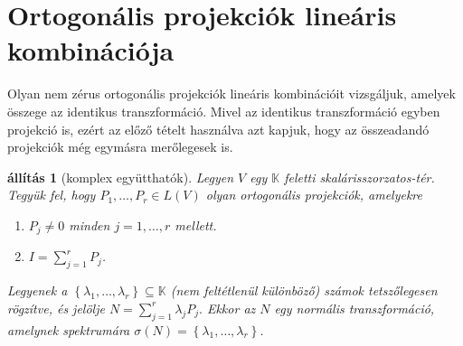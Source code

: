 \documentclass[a4paper, showtrims]{memoir}
\theoremstyle{plain}
\newtheorem{proposition}{állítás}[chapter]
\theoremstyle{remark}
\theoremstyle{definition}
\begin{document}
\section{Ortogonális projekciók lineáris kombinációja}
Olyan nem zérus ortogonális projekciók lineáris kombinációit vizsgáljuk,
amelyek összege az identikus transzformáció.
Mivel az identikus transzformáció egyben projekció is,
ezért az előző tételt használva azt kapjuk, hogy az összeadandó projekciók még egymásra merőlegesek is.
\begin{proposition}[komplex együtthatók]\label{pr:normlinkombkomplex}
	Legyen $V$ egy $\mathbb{K}$ feletti skalárisszorzatos-tér.
	Tegyük fel, hogy $P_1,\ldots,P_r\in L\left( V \right)$ olyan ortogonális projekciók,
	amelyekre
	\begin{enumerate}
		\item $P_j\neq 0$ minden $j=1,\ldots,r$ mellett.
		\item $I=\sum_{j=1}^rP_j$.
	\end{enumerate}
	Legyenek a $\left\{ \lambda_1,\ldots,\lambda_r \right\}\subseteq \mathbb{K}$
	(nem feltétlenül különböző) számok tetszőlegesen rögzítve, és
	jelölje
	\(
	N
	=
	\sum_{j=1}^r\lambda_jP_j.
	\)
	Ekkor az $N$ egy \emph{normális} transzformáció,
	amelynek spektrumára $\sigma\left( N \right)=\left\{ \lambda_1,\ldots,\lambda_r \right\}$.
\end{proposition}
\end{document}
